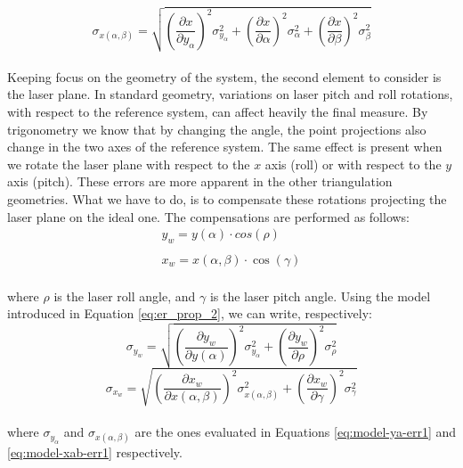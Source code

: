   \begin{equation}
    \label{eq:model-xab-err1}
    \sigma_{x\left( \alpha, \beta \right)} = \sqrt{
      \left( \frac{\partial x}{\partial y_\alpha} \right)^2 \sigma_{y_\alpha}^2 +
      \left( \frac{\partial x}{\partial \alpha} \right)^2 \sigma_\alpha^2 +
      \left( \frac{\partial x}{\partial \beta} \right)^2 \sigma_\beta^2
    }
  \end{equation} \\

Keeping focus on the geometry of the system, the second element to consider is the laser plane. In standard geometry, variations on laser pitch and roll rotations, with respect to the reference system, can affect heavily the final measure. By trigonometry we know that by changing the angle, the point projections also change in the two axes of the reference system. The same effect is present when we rotate the laser plane with respect to the $x$ axis (roll) or with respect to the $y$ axis (pitch). These errors are more apparent in the other triangulation geometries. What we have to do, is to compensate these rotations projecting the laser plane on the ideal one. The compensations are performed as follows:
  \begin{equation}
    \begin{matrix}
      y_w = y(\alpha) \cdot cos(\rho) \\ ~ \\
      x_w = x(\alpha, \beta) \cdot \cos(\gamma)
    \end{matrix}
    \label{eq:radial-compensations}
  \end{equation} \\
where $\rho$ is the laser roll angle, and $\gamma$ is the laser pitch angle. Using the model introduced in Equation \ref{eq:er_prop_2}, we can write, respectively:
  \begin{equation}
    \sigma_{y_w} = \sqrt{
      \left( \frac{\partial y_w}{\partial y(\alpha)} \right)^2 \sigma_{y_\alpha}^2
      + \left( \frac{\partial y_w}{\partial \rho} \right)^2 \sigma_\rho^2
    }
    \label{eq:err-radial-comp-yw}
  \end{equation}
  \begin{equation}
    \sigma_{x_w} = \sqrt{
      \left( \frac{\partial x_w}{\partial x\left( \alpha, \beta \right)} \right)^2 \sigma_{x\left( \alpha, \beta \right)}^2 +
      \left( \frac{\partial x_w}{\partial \gamma} \right)^2 \sigma_\gamma^2
    }
    \label{eq:err-radial-comp-xw}
  \end{equation} \\
where $\sigma_{y_\alpha}$ and $\sigma_{x\left( \alpha, \beta \right)}$ are the ones evaluated in Equations \ref{eq:model-ya-err1} and \ref{eq:model-xab-err1} respectively. \\

